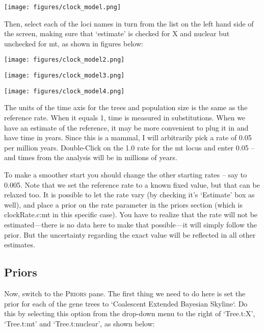 \documentclass[a4paper,11pt]{article}
\begin{document}
\texttt{[image: figures/clock\_model.png]}

Then, select each of the loci names in turn from the list on the left hand side
of the screen, making sure that `estimate' is checked for X and nuclear but
unchecked for mt, as shown in figures below:

\begin{center}
    \texttt{[image: figures/clock\_model2.png]}
\end{center}

\begin{center}
\texttt{[image: figures/clock\_model3.png]}
\end{center}

\begin{center}
\texttt{[image: figures/clock\_model4.png]}
\end{center}

The units of the time axis for the trees and population size is the same as the
reference rate. When it equals 1, time is measured in substitutions. When we
have an estimate of the reference, it may be more convenient to plug it in and
have time in years. Since this is a mammal, I will arbitrarily pick a rate of
0.05 per million years. Double-Click on the 1.0 rate for the mt locus and enter
0.05 – and times from the analysis will be in millions of years.

To make a smoother start you should change the other starting rates – say to
0.005.  Note that we set the reference rate to a known fixed value, but that
can be relaxed too. It is possible to let the rate vary (by checking it's
`Estimate' box as well), and place a prior on the rate parameter in the priors
section (which is clockRate.c:mt in this specific case). You have to realize
that the rate will not be estimated---there is no data here to make that
possible---it will simply follow the prior. But the uncertainty regarding the
exact value will be reflected in all other estimates.

\subsection{Priors}

Now, switch to the \textsc{Priors} pane. The first thing we need to do here is
set the prior for each of the gene trees to `Coalescent Extended Bayesian
Skyline`.  Do this by selecting this option from the drop-down menu to the
right of `Tree.t:X', `Tree.t:mt' and `Tree.t:nuclear', as shown below:
\end{document}
